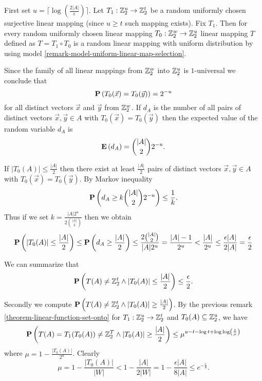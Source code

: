 First set $u = \lceil\log(\frac {2|A|}{\epsilon})\rceil$. Let $T_1: \mathbb{Z}_{2}^{u} \rightarrow \mathbb{Z}_{2}^{t}$ be a random uniformly chosen surjective linear mapping (since $u \geq t$ such mapping exists). Fix $T_1$. Then for every random uniformly chosen linear mapping $T_0: \mathbb{Z}_{2}^{w} \rightarrow \mathbb{Z}_{2}^{u}$ linear mapping $T$ defined as $T = T_1 \circ T_0$  is a random linear mapping with uniform distribution by using model \ref{remark-model-uniform-linear-map-selection}. 

Since the family of all linear mappings from $\mathbb{Z}_{2}^{w}$ into $\mathbb{Z}_{2}^{u}$ is $1$-universal we conclude that \[ \mathbf{P}\left(T_0(\vec{x}) = T_0(\vec{y})\right) = 2 ^ {-u} \] for all distinct vectors $\vec {x}$ and $\vec {y}$ from $\mathbb{Z}_{2}^{w}$. If $d_A$ is the number of  all pairs of distinct vectors $\vec {x},\vec {y}\in A$ with $T_0(\vec {x}) = T_0(\vec {y})$ then the expected value of the random variable $d_A$ is \[ \mathbf{E}\left(d_A\right)= \binom{|A|}{2} 2 ^ {-u} \text{.} \]

If $|T_0(A)| \leq \frac {|A|}{2}$ then there exist at least $\frac {|A
|}{2}$ pairs of distinct vectors $\vec {x},\vec {y} \in A$ with $T_0(\vec {x}) = T_0(\vec {y}
)$. By Markov inequality \[ \mathbf{P}\left(d_A \geq k\binom {|A|}{2} 2^{-u}\right) \leq \frac{1}{k} \text{.} \]
Thus if we set $k = \frac {|A|2^u}{2\binom {|A|}{2}}$ then we obtain 
\[ 
	\mathbf{P}\left(|T_0(A)| \leq \frac {|A|}{2}\right) 
		\leq \mathbf{P}\left(d_A \geq \frac {|A|}{2}\right) 
		\leq \frac{2 \binom{|A|}{2}}{|A|2^u} = \frac{|A| - 1}{2^u} < \frac{|A|}{2^u} 
		\leq \frac{\epsilon |A|}{2|A|} = \frac{\epsilon}2
\]

We can summarize that
\[ 
\mathbf{P}\left(T(A) \neq \mathbb{Z}_{2}^{t} \wedge |T_0(A)| \leq \frac{|A|}{2}\right) \leq \frac{\epsilon}{2} \text{.}
\]

Secondly we compute $\mathbf{P}\left(T(A) \neq \mathbb{Z}_{2}^{t} \wedge |T_0(A)| \geq \frac{|A|}{2}\right)$. By the previous remark \ref{theorem-linear-function-set-onto} for $T_1: \mathbb{Z}_{2}^{u} \rightarrow \mathbb{Z}_{2}^{t}$ and $T_0(A) \subseteq \mathbb{Z}_{2}^{u}$, we have
\[
	\mathbf{P}\left(T(A) = T_1(T_0(A)) \neq \mathbb{Z}_{2}^{T} \wedge |T_0(A)| \geq \frac{|A|}{2}\right) \leq \mu ^ {u - t - \log t  +\log\log \left(\frac{1}{\mu}\right) } 
\]
where $\mu = 1- \frac{|T_0(A)|}{2^u}$. Clearly
\[
\mu = 1 - \frac{|T_0(A)|}{|W|} < 1 - \frac{|A|}{2|W|} = 1 - \frac{\epsilon |A|}{8|A|} \leq e^{-\frac{\epsilon}{8}}
\text{.}
\]

